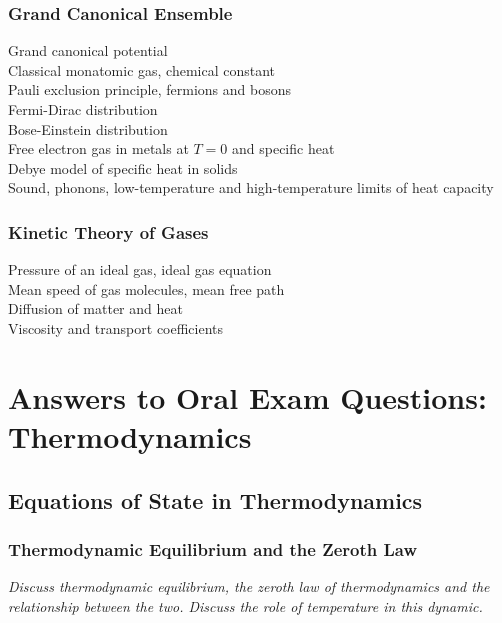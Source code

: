 \documentclass[11pt, a4paper]{article}
\begin{document}
\subsubsection{Grand Canonical Ensemble}
Grand canonical potential\\
Classical monatomic gas, chemical constant\\
Pauli exclusion principle, fermions and bosons\\
Fermi-Dirac distribution\\
Bose-Einstein distribution\\
Free electron gas in metals at $ T = 0 $ and specific heat\\
Debye model of specific heat in solids\\
Sound, phonons, low-temperature and high-temperature limits of heat capacity

\subsubsection{Kinetic Theory of Gases}
Pressure of an ideal gas, ideal gas equation\\
Mean speed of gas molecules, mean free path\\
Diffusion of matter and heat\\
Viscosity and transport coefficients


\fi
\newpage

\section{Answers to Oral Exam Questions: Thermodynamics}

\subsection{Equations of State in Thermodynamics}

\subsubsection{Thermodynamic Equilibrium and the Zeroth Law}
\textit{Discuss thermodynamic equilibrium, the zeroth law of thermodynamics and the relationship between the two. Discuss the role of temperature in this dynamic.}
\end{document}

